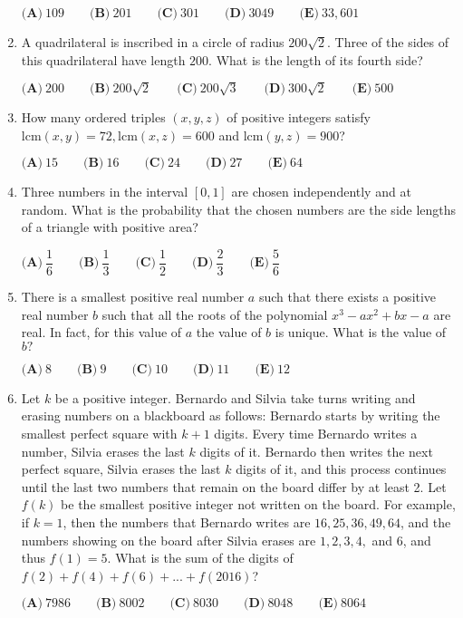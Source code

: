 \documentclass{article}
\begin{document}
\begin{enumerate}[label=\arabic*., itemsep=0.5em]
\(\textbf{(A)}\ 109\qquad\textbf{(B)}\ 201\qquad\textbf{(C)}\ 301\qquad\textbf{(D)}\ 3049\qquad\textbf{(E)}\ 33,601\)\par \vspace{0.5em}\item A quadrilateral is inscribed in a circle of radius \(200\sqrt{2}.\) Three of the sides of this quadrilateral have length \(200.\) What is the length of its fourth side? 

\(\textbf{(A)}\ 200\qquad\textbf{(B)}\ 200\sqrt{2} \qquad\textbf{(C)}\ 200\sqrt{3} \qquad\textbf{(D)}\ 300\sqrt{2} \qquad\textbf{(E)}\ 500\)\par \vspace{0.5em}\item How many ordered triples \((x,y,z)\) of positive integers satisfy \(\text{lcm}(x,y) = 72, \text{lcm}(x,z) = 600\) and \(\text{lcm}(y,z)=900\)?

\(\textbf{(A)}\ 15\qquad\textbf{(B)}\ 16\qquad\textbf{(C)}\ 24\qquad\textbf{(D)}\ 27\qquad\textbf{(E)}\ 64\)\par \vspace{0.5em}\item Three numbers in the interval \(\left[0,1\right]\) are chosen independently and at random. What is the probability that the chosen numbers are the side lengths of a triangle with positive area?

\(\textbf{(A)}\ \dfrac{1}{6}\qquad\textbf{(B)}\ \dfrac{1}{3}\qquad\textbf{(C)}\ \dfrac{1}{2}\qquad\textbf{(D)}\ \dfrac{2}{3}\qquad\textbf{(E)}\ \dfrac{5}{6}\)\par \vspace{0.5em}\item There is a smallest positive real number \(a\) such that there exists a positive real number \(b\) such that all the roots of the polynomial \(x^3-ax^2+bx-a\) are real. In fact, for this value of \(a\) the value of \(b\) is unique. What is the value of \(b?\)

\(\textbf{(A)}\ 8\qquad\textbf{(B)}\ 9\qquad\textbf{(C)}\ 10\qquad\textbf{(D)}\ 11\qquad\textbf{(E)}\ 12\)\par \vspace{0.5em}\item Let \(k\) be a positive integer. Bernardo and Silvia take turns writing and erasing numbers on a blackboard as follows: Bernardo starts by writing the smallest perfect square with \(k+1\) digits. Every time Bernardo writes a number, Silvia erases the last \(k\) digits of it. Bernardo then writes the next perfect square, Silvia erases the last \(k\) digits of it, and this process continues until the last two numbers that remain on the board differ by at least 2. Let \(f(k)\) be the smallest positive integer not written on the board. For example, if \(k = 1\), then the numbers that Bernardo writes are \(16, 25, 36, 49, 64\), and the numbers showing on the board after Silvia erases are \(1, 2, 3, 4,\) and \(6\), and thus \(f(1) = 5\). What is the sum of the digits of \(f(2) + f(4)+ f(6) + ... + f(2016)\)?

\(\textbf{(A)}\ 7986\qquad\textbf{(B)}\ 8002\qquad\textbf{(C)}\ 8030\qquad\textbf{(D)}\ 8048\qquad\textbf{(E)}\ 8064\)\par \vspace{0.5em}\end{enumerate}
\end{document}
